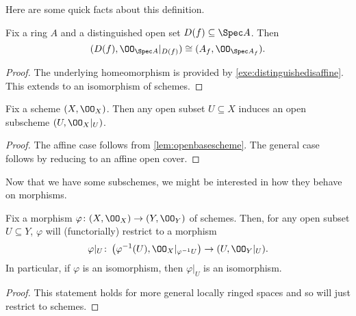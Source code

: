 \documentclass[../notes.tex]{subfiles}
\begin{document}
Here are some quick facts about this definition.
\begin{lemma} \label{lem:openbasescheme}
	Fix a ring $A$ and a distinguished open set $D(f)\subseteq\Spec A$. Then
	\[(D(f),\OO_{\Spec A}|_{D(f)})\cong(A_f,\OO_{\Spec A_f}).\]
\end{lemma}
\begin{proof}
	The underlying homeomorphism is provided by \autoref{exe:distinguishedisaffine}. This extends to an isomorphism of schemes.
\end{proof}
\begin{cor}
	Fix a scheme $(X,\OO_X)$. Then any open subset $U\subseteq X$ induces an open subscheme $(U,\OO_X|_U)$.
\end{cor}
\begin{proof}
	The affine case follows from \autoref{lem:openbasescheme}. The general case follows by reducing to an affine open cover.
\end{proof}
Now that we have some subschemes, we might be interested in how they behave on morphisms.
\begin{lemma} \label{lem:restrictmorphism}
	Fix a morphism $\varphi\colon(X,\OO_X)\to(Y,\OO_Y)$ of schemes. Then, for any open subset $U\subseteq Y$, $\varphi$ will (functorially) restrict to a morphism
	\[\varphi|_U\colon\left(\varphi^{-1}(U),\OO_X|_{\varphi^{-1}U}\right)\to(U,\OO_Y|_U).\]
	In particular, if $\varphi$ is an isomorphism, then $\varphi|_U$ is an isomorphism.
\end{lemma}
\begin{proof}
	This statement holds for more general locally ringed spaces and so will just restrict to schemes.
\end{proof}
\end{document}
